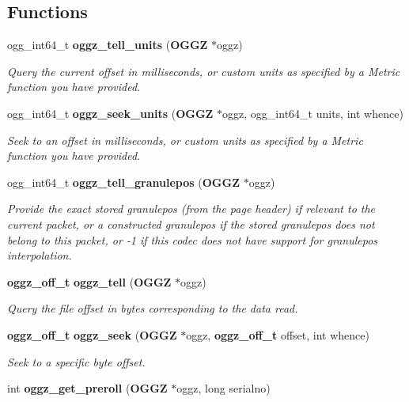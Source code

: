 \subsection*{\-Functions}
\begin{DoxyCompactItemize}
\item 
ogg\-\_\-int64\-\_\-t {\bf oggz\-\_\-tell\-\_\-units} ({\bf \-O\-G\-G\-Z} $\ast$oggz)
\begin{DoxyCompactList}\small\item\em \-Query the current offset in milliseconds, or custom units as specified by a \-Metric function you have provided. \end{DoxyCompactList}\item 
ogg\-\_\-int64\-\_\-t {\bf oggz\-\_\-seek\-\_\-units} ({\bf \-O\-G\-G\-Z} $\ast$oggz, ogg\-\_\-int64\-\_\-t units, int whence)
\begin{DoxyCompactList}\small\item\em \-Seek to an offset in milliseconds, or custom units as specified by a \-Metric function you have provided. \end{DoxyCompactList}\item 
ogg\-\_\-int64\-\_\-t {\bf oggz\-\_\-tell\-\_\-granulepos} ({\bf \-O\-G\-G\-Z} $\ast$oggz)
\begin{DoxyCompactList}\small\item\em \-Provide the exact stored granulepos (from the page header) if relevant to the current packet, or a constructed granulepos if the stored granulepos does not belong to this packet, or -\/1 if this codec does not have support for granulepos interpolation. \end{DoxyCompactList}\item 
{\bf oggz\-\_\-off\-\_\-t} {\bf oggz\-\_\-tell} ({\bf \-O\-G\-G\-Z} $\ast$oggz)
\begin{DoxyCompactList}\small\item\em \-Query the file offset in bytes corresponding to the data read. \end{DoxyCompactList}\item 
{\bf oggz\-\_\-off\-\_\-t} {\bf oggz\-\_\-seek} ({\bf \-O\-G\-G\-Z} $\ast$oggz, {\bf oggz\-\_\-off\-\_\-t} offset, int whence)
\begin{DoxyCompactList}\small\item\em \-Seek to a specific byte offset. \end{DoxyCompactList}\item 
int {\bf oggz\-\_\-get\-\_\-preroll} ({\bf \-O\-G\-G\-Z} $\ast$oggz, long serialno)

\end{DoxyCompactItemize}
